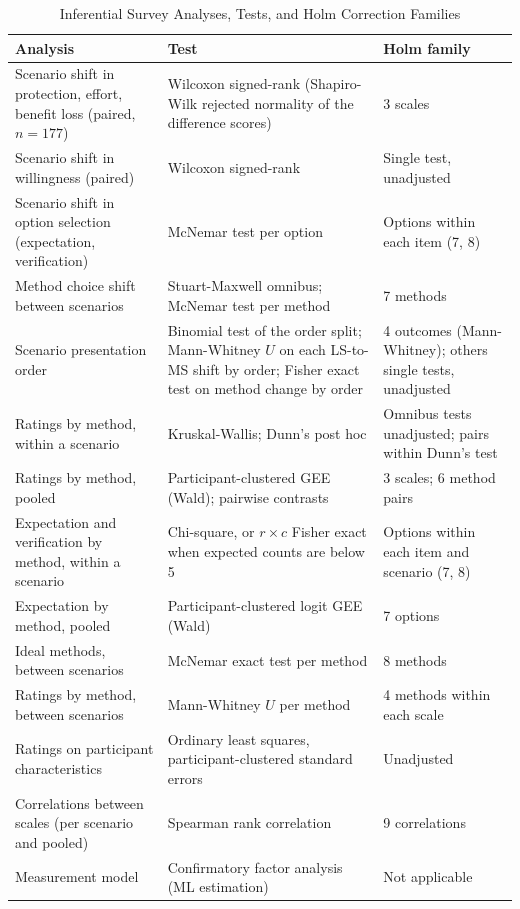 \documentclass[conference,compsoc]{IEEEtran}
\begin{document}
\begin{table}[t]
\centering
\caption{Inferential Survey Analyses, Tests, and Holm Correction Families}
\label{tab:analysis-families}
\small
\begin{tabular}{@{}p{}p{}p{}@{}}
\toprule
Analysis & Test & Holm family \\
\midrule
Scenario shift in protection, effort, benefit loss (paired, $n=177$)
  & Wilcoxon signed-rank (Shapiro-Wilk rejected normality of the difference scores)
  & 3 scales \\
Scenario shift in willingness (paired)
  & Wilcoxon signed-rank
  & Single test, unadjusted \\
Scenario shift in option selection (expectation, verification)
  & McNemar test per option
  & Options within each item (7, 8) \\
Method choice shift between scenarios
  & Stuart-Maxwell omnibus; McNemar test per method
  & 7 methods \\
Scenario presentation order
  & Binomial test of the order split; Mann-Whitney $U$ on each LS-to-MS shift by order; Fisher exact test on method change by order
  & 4 outcomes (Mann-Whitney); others single tests, unadjusted \\
Ratings by method, within a scenario
  & Kruskal-Wallis; Dunn's post hoc
  & Omnibus tests unadjusted; pairs within Dunn's test \\
Ratings by method, pooled
  & Participant-clustered GEE (Wald); pairwise contrasts
  & 3 scales; 6 method pairs \\
Expectation and verification by method, within a scenario
  & Chi-square, or $r\times c$ Fisher exact when expected counts are below 5
  & Options within each item and scenario (7, 8) \\
Expectation by method, pooled
  & Participant-clustered logit GEE (Wald)
  & 7 options \\
Ideal methods, between scenarios
  & McNemar exact test per method
  & 8 methods \\
Ratings by method, between scenarios
  & Mann-Whitney $U$ per method
  & 4 methods within each scale \\
Ratings on participant characteristics
  & Ordinary least squares, participant-clustered standard errors
  & Unadjusted \\
Correlations between scales (per scenario and pooled)
  & Spearman rank correlation
  & 9 correlations \\
Measurement model
  & Confirmatory factor analysis (ML estimation)
  & Not applicable \\
\bottomrule
\end{tabular}
\end{table}
\end{document}
